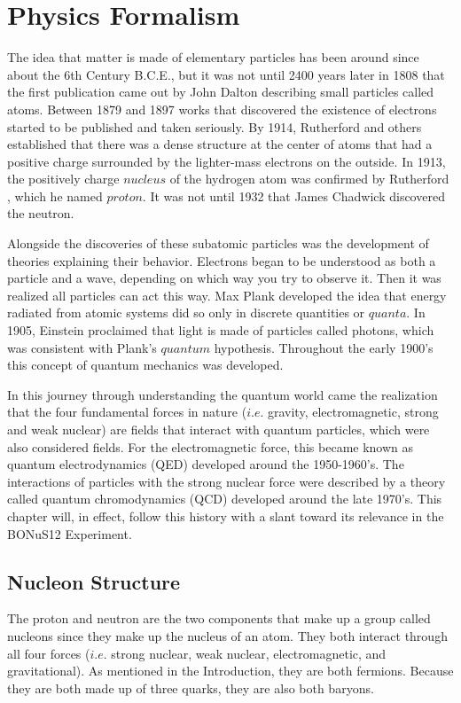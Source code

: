 \chapter{Physics Formalism}
\label{ch:physrev}
The idea that matter is made of elementary particles has been around since about the 6th Century B.C.E., but it was not until 2400 years later in 1808 \cite{book:dalton} that the first publication came out by John Dalton describing small particles called atoms. Between 1879 \cite{crookes} and 1897 \cite{thomson} works that discovered the existence of electrons started to be published and taken seriously. By 1914, Rutherford \cite{book:rutherford1} and others established that there was a dense structure at the center of atoms that had a positive charge surrounded by the lighter-mass electrons on the outside. In 1913, the positively charge $nucleus$ of the hydrogen atom was confirmed by Rutherford \cite{book:rutherford2}, which he named $proton$. It was not until 1932 that James Chadwick discovered the neutron.

Alongside the discoveries of these subatomic particles was the development of theories explaining their behavior. Electrons began to be understood as both a particle and a wave, depending on which way you try to observe it. Then it was realized all particles can act this way. Max Plank developed the idea that energy radiated from atomic systems did so only in discrete quantities or $quanta$. In 1905, Einstein \cite{einstein} proclaimed that light is made of particles called photons, which was consistent with Plank's $quantum$ hypothesis. Throughout the early 1900's this concept of quantum mechanics was developed.

In this journey through understanding the quantum world came the realization that the four fundamental forces in nature ($i.e.$ gravity, electromagnetic, strong and weak nuclear) are fields that interact with quantum particles, which were also considered fields. For the electromagnetic force, this became known as quantum electrodynamics (QED) developed around the 1950-1960's. The interactions of particles with the strong nuclear force were described by a theory called quantum chromodynamics (QCD) developed around the late 1970's. This chapter will, in effect, follow this history with a slant toward its relevance in the BONuS12 Experiment.

\section{Nucleon Structure}
The proton and neutron are the two components that make up a group called nucleons since they make up the nucleus of an atom. They both interact through all four forces ($i.e.$ strong nuclear, weak nuclear, electromagnetic, and gravitational). As mentioned in the Introduction, they are both fermions. Because they are both made up of three quarks, they are also both baryons.

